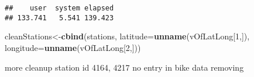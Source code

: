 \documentclass[]{article}
\newenvironment{Shaded}{\begin{snugshade}}{\end{snugshade}}
\newcommand{\KeywordTok}[1]{\textcolor[rgb]{0.13,0.29,0.53}{\textbf{#1}}}
\newcommand{\DataTypeTok}[1]{\textcolor[rgb]{0.13,0.29,0.53}{#1}}
\newcommand{\DecValTok}[1]{\textcolor[rgb]{0.00,0.00,0.81}{#1}}
\newcommand{\StringTok}[1]{\textcolor[rgb]{0.31,0.60,0.02}{#1}}
\newcommand{\OtherTok}[1]{\textcolor[rgb]{0.56,0.35,0.01}{#1}}
\newcommand{\OperatorTok}[1]{\textcolor[rgb]{0.81,0.36,0.00}{\textbf{#1}}}
\newcommand{\NormalTok}[1]{#1}
\begin{document}
\begin{verbatim}
##    user  system elapsed 
## 133.741   5.541 139.423
\end{verbatim}

\begin{Shaded}
\begin{Highlighting}[]
\NormalTok{cleanStations<-}\KeywordTok{cbind}\NormalTok{(stations, }\DataTypeTok{latitude=}\KeywordTok{unname}\NormalTok{(vOfLatLong[}\DecValTok{1}\NormalTok{,]), }\DataTypeTok{longitude=}\KeywordTok{unname}\NormalTok{(vOfLatLong[}\DecValTok{2}\NormalTok{,]))}
\end{Highlighting}
\end{Shaded}

more cleanup station id 4164, 4217 no entry in bike data removing

\begin{Shaded}
\end{Shaded}
\end{document}
